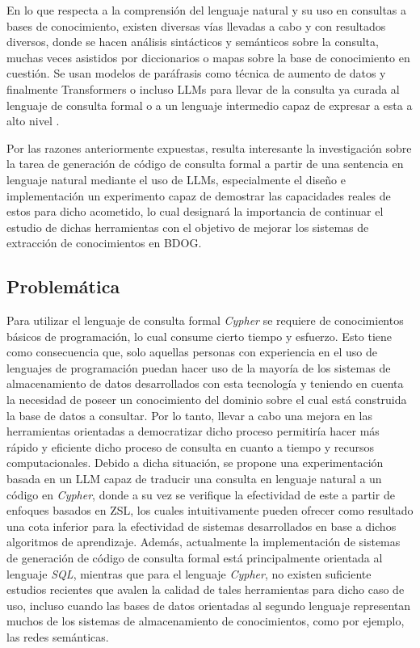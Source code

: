 En lo que respecta a la comprensión del lenguaje natural y su uso en consultas a bases de conocimiento, existen diversas vías llevadas a cabo y con resultados diversos, donde se hacen análisis sintácticos y semánticos sobre la consulta, muchas veces asistidos por diccionarios o mapas sobre la base de conocimiento en cuestión. Se usan modelos de paráfrasis como técnica de aumento de datos y finalmente Transformers \cite{transformers} o incluso LLMs para llevar de la consulta ya curada al lenguaje de consulta formal o a un lenguaje intermedio capaz de expresar a esta a alto nivel \cite{text2sql1} \cite{text2cypher1}.

Por las razones anteriormente expuestas, resulta interesante la investigación sobre la tarea de generación de código de consulta formal a partir de una sentencia en lenguaje natural mediante el uso de LLMs, especialmente el diseño e implementación un experimento capaz de demostrar las capacidades reales de estos para dicho acometido, lo cual designará la importancia de continuar el estudio de dichas herramientas con el objetivo de mejorar los sistemas de extracción de conocimientos en BDOG.

\subsection*{Problemática}
Para utilizar el lenguaje de consulta formal \textit{Cypher} se requiere de conocimientos básicos de programación, lo cual consume cierto tiempo y esfuerzo. Esto tiene como consecuencia que, solo aquellas personas con experiencia en el uso de lenguajes de programación puedan hacer uso de la mayoría de los sistemas de almacenamiento de datos desarrollados con esta tecnología y teniendo en cuenta la necesidad de poseer un conocimiento del dominio sobre el cual está construida la base de datos a consultar. Por lo tanto, llevar a cabo una mejora en las herramientas orientadas a democratizar dicho proceso permitiría hacer más rápido y eficiente dicho proceso de consulta en cuanto a tiempo y recursos computacionales. Debido a dicha situación, se propone una experimentación basada en un LLM capaz de traducir una consulta en lenguaje natural a un código en \textit{Cypher}, donde a su vez se verifique la efectividad de este a partir de enfoques basados en ZSL, los cuales intuitivamente pueden ofrecer como resultado una cota inferior para la efectividad de sistemas desarrollados en base a dichos algoritmos de aprendizaje. Además, actualmente la implementación de sistemas de generación de código de consulta formal está principalmente orientada al lenguaje \textit{SQL}, mientras que para el lenguaje \textit{Cypher}, no existen suficiente estudios recientes que avalen la calidad de tales herramientas para dicho caso de uso, incluso cuando las bases de datos orientadas al segundo lenguaje representan muchos de los sistemas de almacenamiento de conocimientos, como por ejemplo, las redes semánticas.

